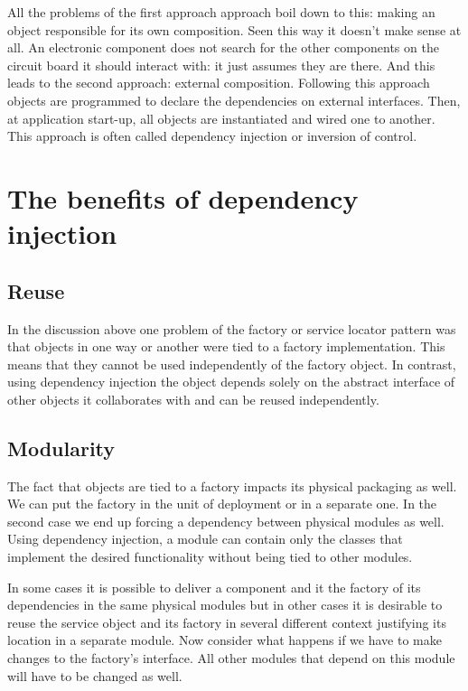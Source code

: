 All the problems of the first approach approach boil down to this: making an object responsible for its own composition. Seen this way it doesn't make
sense at all. An electronic component does not search for the other components on the circuit board it should interact with: it just assumes
they are there. And this leads to the second approach: external composition. Following this approach objects are programmed to declare the dependencies
on external interfaces. Then, at application start-up, all objects are instantiated and wired one to another. This approach is often called dependency
injection or inversion of control.

\section{The benefits of dependency injection}

\subsection{Reuse}

In the discussion above one problem of the factory or service locator pattern was that objects in one way or another were tied to a factory
implementation. This means that they cannot be used independently of the factory object. In contrast, using dependency injection the object
depends solely on the abstract interface of other objects it collaborates with and can be reused independently.

\subsection{Modularity}

The fact that objects are tied to a factory impacts its physical packaging as well. We can put the factory in the unit of
deployment or in a separate one. In the second case we end up forcing a dependency between physical modules as well.
Using dependency injection, a module can contain only the classes that implement the desired functionality without being
tied to other modules.

In some cases it is possible to deliver a component and it the factory of its dependencies in the same physical modules
but in other cases it is desirable to reuse the service object and its factory in several different context justifying its
location in a separate module. Now consider what happens if we have to make changes to the factory's interface. All other
modules that depend on this module will have to be changed as well.

